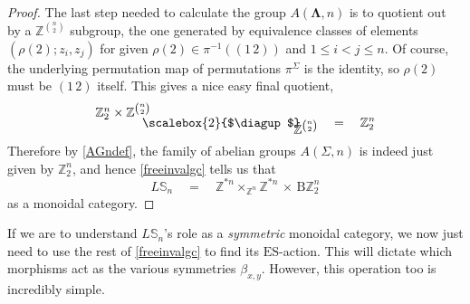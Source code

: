 \documentclass{amsbook} %
\newcommand{\ML}{\mathbf{\Lambda}}
\newcommand{\bigquotient}[2]{ \raisebox{0.75\height}{$#1$} \mkern-12mu\scalebox{2}{$\diagup$}\mkern-10mu \raisebox{-0.5\height}{$#2$} }
\numberwithin{section}{chapter}
\begin{document}
\begin{proof}
The last step needed to calculate the group $A(\ML,n)$ is to quotient out by a $\mathbb{Z}^{{n}\choose{2}}$ subgroup, the one generated by equivalence classes of elements $(\rho(2) ; z_i, z_j )$ for given $\rho(2) \in \pi^{-1}((1 \, 2))$ and $1 \le i < j \le n$. Of course, the underlying permutation map of permutations $\pi^{\Sigma}$ is the identity, so $\rho(2)$ must be $(1 \, 2)$ itself. This gives a nice easy final quotient,
\[ \bigquotient{\mathbb{Z}_2^{n} \times \mathbb{Z}^{{n}\choose{2}}}{\mathbb{Z}^{{n}\choose{2}}} \quad = \quad \mathbb{Z}_2^{n}\]
Therefore by \cref{AGndef}, the family of abelian groups $A(\Sigma,n)$ is indeed just given by $\mathbb{Z}_2^{n}$, and hence \cref{freeinvalgc} tells us that
\[ L\mathbb{S}_n \quad = \quad \mathbb{Z}^{\ast n} \times_{\mathbb{Z}^n} \mathbb{Z}^{\ast n}  \, \times \, \mathrm{B}\mathbb{Z}_2^{n} \]
as a monoidal category.
\end{proof} 

If we are to understand $L\mathbb{S}_n$'s role as a \emph{symmetric} monoidal category, we now just need to use the rest of \cref{freeinvalgc} to find its $\mathrm{ES}$-action. This will dictate which morphisms act as the various symmetries $\beta_{x, y}$. However, this operation too is incredibly simple.
\end{document}
